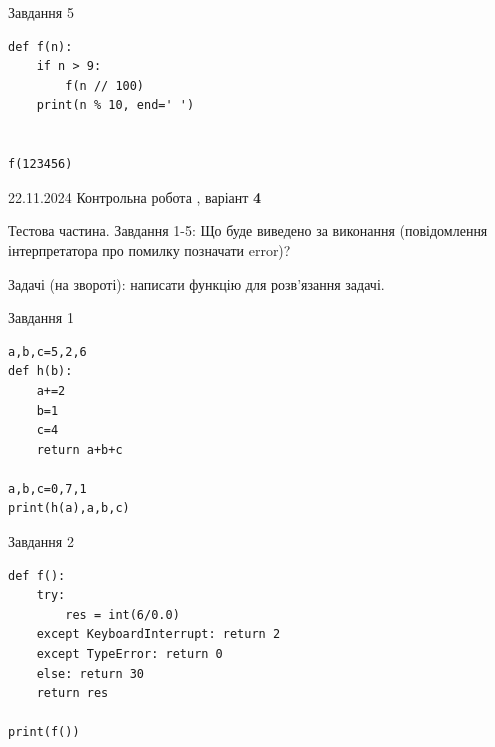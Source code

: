 \documentclass[12pt, ukrainian]{article}
\begin{document}
{{{\begin{minipage}[t]{10.7cm}
\vspace{5mm}
               
{\begin{center}Завдання {5}\end{center}}
\vspace{-6mm}

\begin{verbatim}
def f(n):
    if n > 9:
        f(n // 100)
    print(n % 10, end=' ')
    

f(123456)
\end{verbatim}


\end{minipage}

\newpage

{{22.11.2024 Контрольна робота , варіант  \No \textbf { 4 }\par}}
{

Тестова частина. Завдання 1-5: Що буде виведено за виконання (повідомлення інтерпретатора про помилку позначати error)?

Задачі (на звороті): написати функцію для розв'язання задачі.

\vspace{5mm} \begin{minipage}[t]{8.5cm}
               
{\begin{center}Завдання {1}\end{center}}
\vspace{-6mm}

\begin{verbatim}
a,b,c=5,2,6
def h(b):
    a+=2
    b=1
    c=4
    return a+b+c

a,b,c=0,7,1
print(h(a),a,b,c)
\end{verbatim}


\vspace{5mm}
               
{\begin{center}Завдання {2}\end{center}}
\vspace{-6mm}

\begin{verbatim}
def f():
    try:
        res = int(6/0.0)
    except KeyboardInterrupt: return 2
    except TypeError: return 0
    else: return 30
    return res

print(f())
\end{verbatim}


\vspace{5mm}
               

\end{minipage}}}}}
\end{document}
